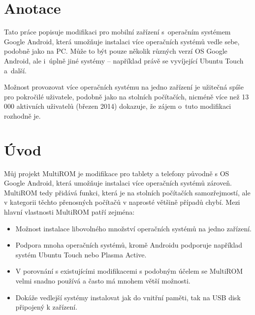 \documentclass[12pt, a4paper, oneside]{article}
\begin{document}
\section*{Anotace}

Tato práce popisuje modifikaci pro mobilní zařízení s~operačním systémem Google Android, která umožňuje instalaci více operačních systémů vedle sebe, podobně jako na PC. Může to být pouze několik různých verzí OS Google Android, ale i~úplně jiné systémy -- například právě se vyvíjející Ubuntu Touch a~další.

Možnost provozovat více operačních systému na jedno zařízení je užitečná spíše pro pokročilé uživatele, podobně jako na stolních počítačích, nicméně více než 13 000 aktivních uživatelů (březen 2014) dokazuje, že zájem o~tuto modifikaci rozhodně je.

\addtolength{\textheight}{30mm} %

\newpage
\pagestyle{plain}

\setlength{\voffset}{-20mm} %
\setcounter{page}{1}  %

\tableofcontents  %

\addtolength{\textheight}{-30mm} %
\newpage
\setlength{\voffset}{0mm} %
\pagestyle{plain}

\section*{Úvod}
\label{uvod}
Můj projekt MultiROM je modifikace pro tablety a telefony původně s OS Google Android, která umožňuje instalaci více operačních systémů zároveň. MultiROM tedy přidává funkci, která je na stolních počítačích samozřejmostí, ale v kategorii těchto přenosných počítačů v naprosté většině případů chybí. Mezi hlavní vlastnosti MultiROM patří zejména:

\begin{itemize}
    \item Možnost instalace libovolného množství operačních systémů na jedno zařízení.
    \item Podpora mnoha operačních systémů, kromě Androidu podporuje například systém Ubuntu Touch nebo Plasma Active.
    \item V porovnání s existujícími modifikacemi s podobným účelem se MultiROM velmi snadno používá a často má mnohem větší možnosti.
    \item Dokáže vedlejší systémy instalovat jak do vnitřní paměti, tak na USB disk připojený k zařízení.
\end{itemize}
\end{document}
